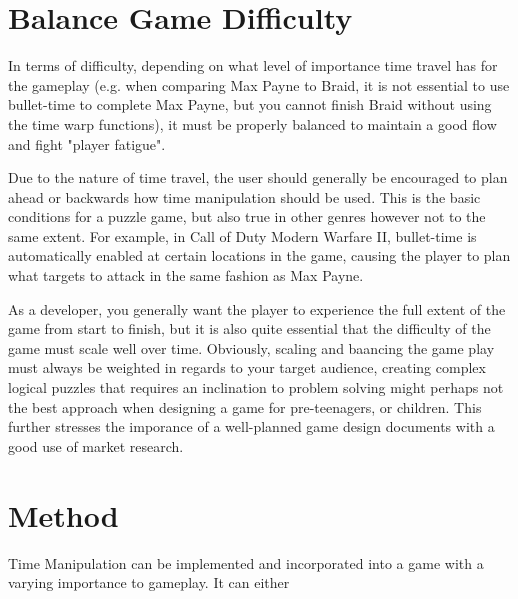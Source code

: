 \section{Balance Game Difficulty}
In terms of difficulty, depending on what level of importance time travel has for the gameplay (e.g. when comparing Max Payne to Braid, it is not essential to use bullet-time to complete Max Payne, but you cannot finish Braid without using the time warp functions), it must be properly balanced to maintain a good flow and fight "player fatigue". 

Due to the nature of time travel, the user should generally be encouraged to plan ahead or backwards how time manipulation should be used. This is the basic conditions for a puzzle game, but also true in other genres however not to the same extent. For example, in Call of Duty Modern Warfare II, bullet-time is automatically enabled at certain locations in the game, causing the player to plan what targets to attack in the same fashion as Max Payne. 

As a developer, you generally want the player to experience the full extent of the game from start to finish, but it is also quite essential that the difficulty of the game must scale well over time. Obviously, scaling and baancing the game play must always be weighted in regards to your target audience, creating complex logical puzzles that requires an inclination to problem solving might perhaps not the best approach when designing a game for pre-teenagers, or children. This further stresses the imporance of a well-planned game design documents with a good use of market research. 


\section{Method}

Time Manipulation can be implemented and incorporated into a game with a varying importance to gameplay. It can either 



